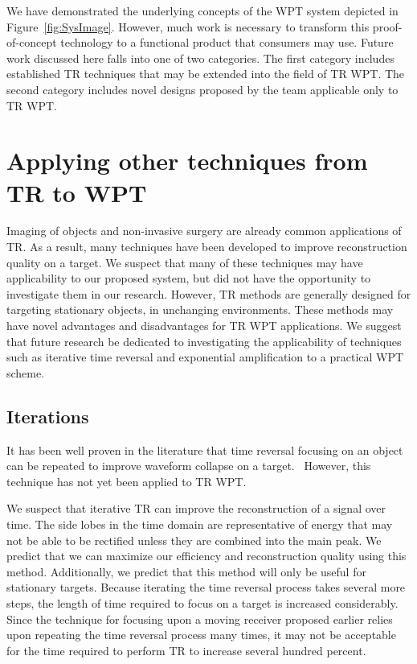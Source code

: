 We have demonstrated the underlying concepts of the WPT system depicted in Figure~\ref{fig:SysImage}.
However, much work is necessary to transform this proof-of-concept technology to a functional product that consumers may use.
Future work discussed here falls into one of two categories. The first category includes established TR techniques that may be extended into the field of TR WPT.
The second category includes novel designs proposed by the team applicable only to TR WPT.

\section{Applying other techniques from TR to WPT}
\label{sec:future-tr}
Imaging of objects and non-invasive surgery are already common applications of TR.
As a result, many techniques have been developed to improve reconstruction quality on a target.
We suspect that many of these techniques may have applicability to our proposed system, but did not
have the opportunity to investigate them in our research.
However, TR methods are generally designed for targeting stationary objects, in unchanging environments. These methods may have novel advantages and disadvantages for TR WPT applications. We suggest that future research be dedicated to investigating the applicability of techniques such as iterative time reversal and exponential amplification to a practical WPT scheme.

\subsection{Iterations}

It has been well proven in the literature that time reversal focusing on an object can be repeated to improve waveform collapse on a target.~\cite{prada_iterative_1991} However, this technique has not yet been applied to TR WPT.

We suspect that iterative TR can improve the reconstruction of a signal over time. The side lobes in the time domain are representative of energy that may not be able to be rectified unless they are combined into the main peak. We predict that we can maximize our efficiency and reconstruction quality using this method. Additionally, we predict that this method will only be useful for stationary targets. Because iterating the time reversal process takes several more steps, the length of time required to focus on a target is increased considerably. Since the technique for focusing upon a moving receiver proposed earlier relies upon repeating the time reversal process many times, it may not be acceptable for the time required to perform TR to increase several hundred percent.

